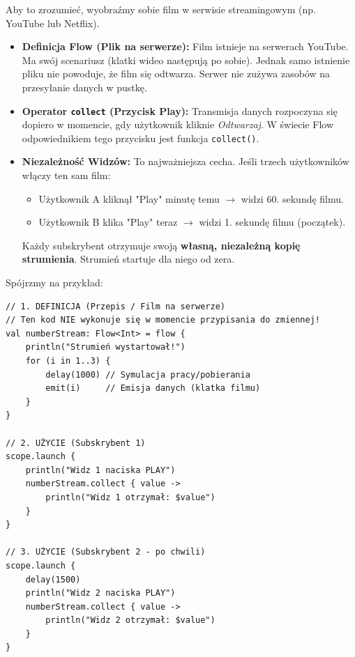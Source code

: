 Aby to zrozumieć, wyobraźmy sobie film w serwisie streamingowym (np. YouTube lub Netflix).

\begin{itemize}
    \item \textbf{Definicja Flow (Plik na serwerze):} Film istnieje na serwerach YouTube. Ma swój scenariusz (klatki wideo następują po sobie). Jednak samo istnienie pliku nie powoduje, że film się odtwarza. Serwer nie zużywa zasobów na przesyłanie danych w pustkę.
    
    \item \textbf{Operator \texttt{collect} (Przycisk Play):} Transmisja danych rozpoczyna się dopiero w momencie, gdy użytkownik kliknie \textit{Odtwarzaj}. W świecie Flow odpowiednikiem tego przycisku jest funkcja \texttt{collect()}.
    
    \item \textbf{Niezależność Widzów:} To najważniejsza cecha. Jeśli trzech użytkowników włączy ten sam film:
    \begin{itemize}
        \item Użytkownik A kliknął "Play" minutę temu $\rightarrow$ widzi 60. sekundę filmu.
        \item Użytkownik B klika "Play" teraz $\rightarrow$ widzi 1. sekundę filmu (początek).
    \end{itemize}
    Każdy subskrybent otrzymuje swoją \textbf{własną, niezależną kopię strumienia}. Strumień startuje dla niego od zera.
\end{itemize}

Spójrzmy na przykład:

\begin{verbatim}
// 1. DEFINICJA (Przepis / Film na serwerze)
// Ten kod NIE wykonuje się w momencie przypisania do zmiennej!
val numberStream: Flow<Int> = flow {
    println("Strumień wystartował!") 
    for (i in 1..3) {
        delay(1000) // Symulacja pracy/pobierania
        emit(i)     // Emisja danych (klatka filmu)
    }
}

// 2. UŻYCIE (Subskrybent 1)
scope.launch {
    println("Widz 1 naciska PLAY")
    numberStream.collect { value -> 
        println("Widz 1 otrzymał: $value") 
    }
}

// 3. UŻYCIE (Subskrybent 2 - po chwili)
scope.launch {
    delay(1500)
    println("Widz 2 naciska PLAY")
    numberStream.collect { value -> 
        println("Widz 2 otrzymał: $value") 
    }
}
\end{verbatim}

